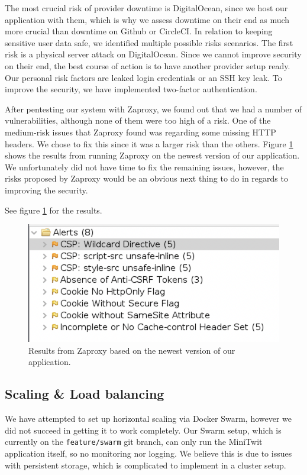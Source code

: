 The most crucial risk of provider downtime is DigitalOcean, since we host our application with them, which is why we assess downtime on their end as much more crucial than downtime on Github or CircleCI.
\newline
In relation to keeping sensitive user data safe, we identified multiple possible risks scenarios.
The first risk is a physical server attack on DigitalOcean. Since we cannot improve security on their end, the best course of action is to have another provider setup ready. Our personal risk factors are leaked login credentials or an SSH key leak. To improve the security, we have implemented two-factor authentication.



After pentesting our system with Zaproxy, we found out that we had a number of vulnerabilities, although none of them were too high of a risk. 
One of the medium-risk issues that Zaproxy found was regarding some missing HTTP headers. We chose to fix this since it was a larger risk than the others. Figure \ref{fig:Zaproxy_Updated} shows the results from running Zaproxy on the newest version of our application. We unfortunately did not have time to fix the remaining issues, however, the risks proposed by Zaproxy would be an obvious next thing to do in regards to improving the security.

See figure \ref{fig:Zaproxy_Updated} for the results.

\begin{figure}[H]
    \centering
    \includegraphics[scale=0.50]{images/security_risks_updated.png}
    \caption{Results from Zaproxy based on the newest version of our application.}
    \label{fig:Zaproxy_Updated}
\end{figure}


\subsection{Scaling \& Load balancing}

We have attempted to set up horizontal scaling via Docker Swarm, however we did not succeed in getting it to work completely. Our Swarm setup, which is currently on the \texttt{feature/swarm} git branch, can only run the MiniTwit application itself, so no monitoring nor logging. We believe this is due to issues with persistent storage, which is complicated to implement in a cluster setup.
